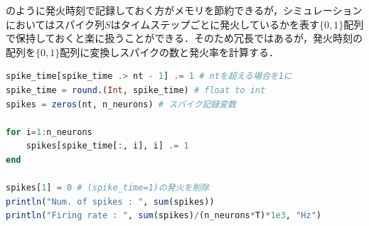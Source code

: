 のように発火時刻で記録しておく方がメモリを節約できるが，シミュレーションにおいてはスパイク列$S$はタイムステップごとに発火しているかを表す$\{0,1\}$配列で保持しておくと楽に扱うことができる．そのため冗長ではあるが，発火時刻の配列を$\{0,1\}$配列に変換しスパイクの数と発火率を計算する．
\begin{lstlisting}[language=julia]
spike_time[spike_time .> nt - 1] .= 1 # ntを超える場合を1に
spike_time = round.(Int, spike_time) # float to int
spikes = zeros(nt, n_neurons) # スパイク記録変数

for i=1:n_neurons    
    spikes[spike_time[:, i], i] .= 1
end

spikes[1] = 0 # (spike_time=1)の発火を削除
println("Num. of spikes : ", sum(spikes))
println("Firing rate : ", sum(spikes)/(n_neurons*T)*1e3, "Hz")
\end{lstlisting}
